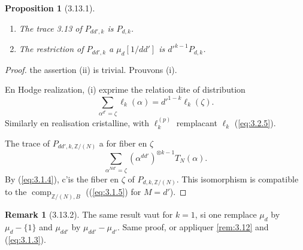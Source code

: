 \documentclass[12pt,a4paper]{article}
\theoremstyle{plain}
\newtheorem{proposition}[theorem]{Proposition}
\theoremstyle{definition}
\newtheorem{remark}[theorem]{Remark}
\theoremstyle{remark}
\providecommand{\comp}{\operatorname{comp}}
\begin{document}
\begin{proposition}[3.13.1]\label{prop:3.13.1}
\leavevmode
\begin{enumerate}[label=(\roman*)]
\item The trace 3.13 of $P_{dd',k}$ is $P_{d,k}$.
\item The restriction of $P_{dd',k}$ a $\mu_d[1/dd']$ is $d'^{k-1} P_{d,k}$.
\end{enumerate}
\end{proposition}
\begin{proof}
the assertion (ii) is trivial. Prouvons (i).

En Hodge realization, (i) exprime the relation dite of distribution
\[
\sum_{\alpha^{d'}=\zeta} \ell_k(\alpha) = d'^{1-k} \ell_k(\zeta).
\]
Similarly en realisation cristalline, with $\ell_k^{(p)}$ remplacant $\ell_k$
(\ref{eq:3.2.5}).

The trace of $P_{dd',k,\mathbb{Z}/(N)}$ a for fiber en $\zeta$
\[
\sum_{\alpha^{Nd'}=\zeta} (\alpha^{dd'})^{\otimes k-1} T_N(\alpha).
\]
By (\ref{eq:3.1.4}), c'is the fiber en $\zeta$ of $P_{d,k,\mathbb{Z}/(N)}$. This
isomorphism is compatible to the $\comp_{\mathbb{Z}/(N),B}$ ((\ref{eq:3.1.5}) for
$M = d'$).
\end{proof}

\begin{remark}[3.13.2]\label{rem:3.13.2}
The same result vaut for $k = 1$, si one remplace $\mu_d$ by $\mu_d - \{1\}$ and
$\mu_{dd'}$ by $\mu_{dd'} - \mu_{d'}$. Same proof, or appliquer \ref{rem:3.12} and
(\ref{eq:3.1.3}).
\end{remark}
\end{document}
